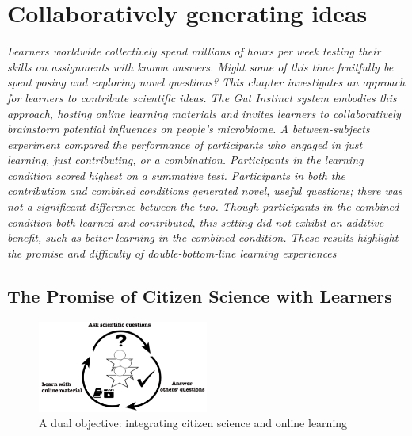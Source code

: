 \chapter{Collaboratively generating ideas}
\noindent \textit{Learners worldwide collectively spend millions of hours per week testing their skills on assignments with known answers. Might some of this time fruitfully be spent posing and exploring novel questions? This chapter investigates an approach for learners to contribute scientific ideas. The Gut Instinct system embodies this approach, hosting online learning materials and invites learners to collaboratively brainstorm potential influences on people’s microbiome. A between-subjects experiment compared the performance of participants who engaged in just learning, just contributing, or a combination. Participants in the learning condition scored highest on a summative test. Participants in both the contribution and combined conditions generated novel, useful questions; there was not a significant difference between the two. Though participants in the combined condition both learned and contributed, this setting did not exhibit an additive benefit, such as better learning in the combined condition. These results highlight the promise and difficulty of double-bottom-line learning experiences}


\section{The Promise of Citizen Science with Learners}

\begin{figure}
  \centering
  \includegraphics[width=0.5\textwidth]{figures/gutinstinct/gi-1.png}
  \caption[A dual objective: integrating citizen science and online learning]
{A dual objective: integrating citizen science and online learning}
  \label{fig:gi-1}
\end{figure}

